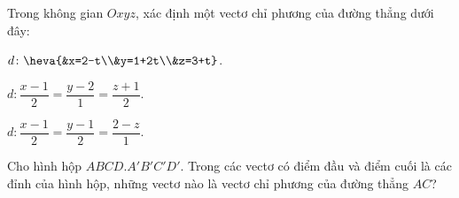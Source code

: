 \begin{bt}%
	Trong không gian $Oxyz$, xác định một vectơ chỉ phương của đường thẳng dưới  đây:
	\begin{listEX}
		 \item $d \colon \heva{&x=2-t\\&y=1+2t\\&z=3+t}$.
		\item  $d \colon \dfrac{x-1}{2}=\dfrac{y-2}{1}=\dfrac{z+1}{2}$.
		\item $d  \colon \dfrac{x-1}{2}=\dfrac{y-1}{2}=\dfrac{2-z}{1}$.
	\end{listEX}
\end{bt}

\begin{bt}%
	Cho hình hộp $ABCD.A'B'C'D'$. Trong các vectơ có điểm đầu và điểm cuối là các đỉnh của hình hộp, những vectơ nào là  vectơ chỉ phương của đường thẳng $AC$?
\end{bt}

